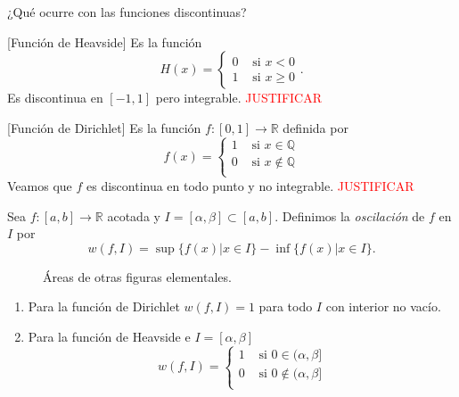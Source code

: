  
¿Qué ocurre con las funciones discontinuas? 

\begin{ejemplo}{}[Función de Heavside] Es la función
\[
 H(x)=\begin{cases}0 & \text{ si } x<0\\1 & \text{ si } x\geq 0\end{cases}.
\]
Es discontinua en $[-1,1]$ pero integrable.  \textcolor{red}{JUSTIFICAR}
 
\end{ejemplo}



\begin{ejemplo}{}[Función de Dirichlet] Es la función $f:[0,1]\to\mathbb{R}$ definida por 
\[
 f(x)=\begin{cases} 1 & \text{ si } x\in\mathbb{Q}\\0 & \text{ si }   x\notin\mathbb{Q}\\
\end{cases}
\]
Veamos que $f$ es discontinua en todo punto y no integrable. \textcolor{red}{JUSTIFICAR}
\end{ejemplo}


 
\begin{definicion}{} Sea $f:[a,b]\to\mathbb{R}$ acotada y $I=[\alpha,\beta]\subset [a,b]$. Definimos la \emph{oscilación} de $f$ en $I$ por 
\[
 w(f,I)=\sup\{f(x)| x\in I\}-\inf\{f(x)| x\in I\}.
\]
\end{definicion}
\begin{figure}[h]
 \begin{center}

 \end{center}
 \caption{Áreas de otras figuras elementales.}\label{fig:paral-trig}
\end{figure}

\begin{ejemplo}{} 
\begin{enumerate}
 \item Para la función de Dirichlet $w(f,I)=1$ para todo $I$ con interior no vacío.
 \item Para la función de Heavside e $I=[\alpha,\beta]$
 \[
  w(f,I)=\begin{cases}
          1 & \text{ si } 0\in (\alpha,\beta]\\
          0 & \text{ si } 0\notin (\alpha,\beta]\\
         \end{cases}
 \]
\end{enumerate}
\end{ejemplo}






